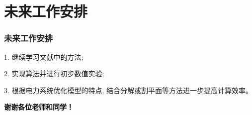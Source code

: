 \documentclass{beamer}
\begin{document}
\begin{frame}
	\frametitle{} 

\end{frame}

\begin{frame}

\end{frame}

\begin{frame}

\end{frame}

\begin{frame}

\end{frame}

\begin{frame}

\end{frame}

\section{未来工作安排}
\begin{frame}
	\frametitle{未来工作安排} 
	1. 继续学习文献中的方法;

	2. 实现算法并进行初步数值实验;

	3. 根据电力系统优化模型的特点, 结合分解或割平面等方法进一步提高计算效率。
\end{frame}

\begin{frame}
	\vspace{1em}
	\centering
	\textcolor{black}{\LARGE\bf 谢谢各位老师和同学！}

\end{frame}
\end{document}
